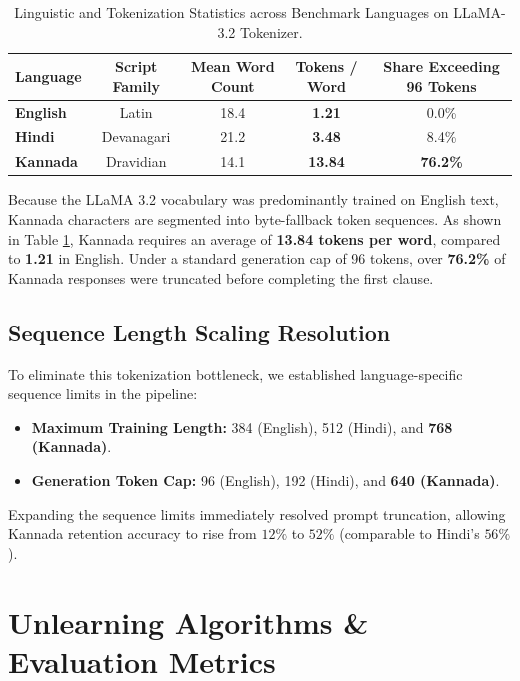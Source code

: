 \documentclass[11pt,a4paper]{article}
\begin{document}
\begin{table}[htbp]
\centering
\small
\caption{Linguistic and Tokenization Statistics across Benchmark Languages on LLaMA-3.2 Tokenizer.}
\label{tab:token_fertility}
\begin{tabular}{lcccc}
\toprule
\textbf{Language} & \textbf{Script Family} & \textbf{Mean Word Count} & \textbf{Tokens / Word} & \textbf{Share Exceeding 96 Tokens} \\
\midrule
\textbf{English} & Latin & 18.4 & \textbf{1.21} & 0.0\% \\
\textbf{Hindi} & Devanagari & 21.2 & \textbf{3.48} & 8.4\% \\
\textbf{Kannada} & Dravidian & 14.1 & \textbf{13.84} & \textbf{76.2\%} \\
\bottomrule
\end{tabular}
\end{table}

Because the LLaMA 3.2 vocabulary was predominantly trained on English text, Kannada characters are segmented into byte-fallback token sequences. As shown in Table \ref{tab:token_fertility}, Kannada requires an average of \textbf{13.84 tokens per word}, compared to \textbf{1.21} in English. Under a standard generation cap of 96 tokens, over \textbf{76.2\%} of Kannada responses were truncated before completing the first clause.

\subsection{Sequence Length Scaling Resolution}
To eliminate this tokenization bottleneck, we established language-specific sequence limits in the pipeline:
\begin{itemize}
    \item \textbf{Maximum Training Length:} 384 (English), 512 (Hindi), and \textbf{768 (Kannada)}.
    \item \textbf{Generation Token Cap:} 96 (English), 192 (Hindi), and \textbf{640 (Kannada)}.
\end{itemize}
Expanding the sequence limits immediately resolved prompt truncation, allowing Kannada retention accuracy to rise from $12\%$ to $52\%$ (comparable to Hindi's $56\%$).

\section{Unlearning Algorithms \& Evaluation Metrics}
\label{sec:algorithms}
\end{document}

